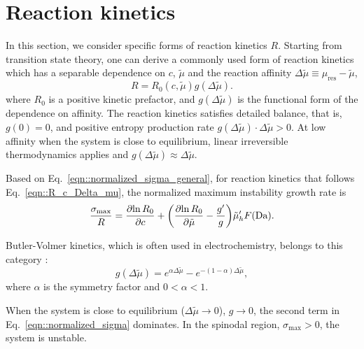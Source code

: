 \documentclass[reprint,aps,pre,superscriptaddress]{revtex4-2}
\newcommand{\pderiv}[2]{\frac{\partial {#1}}{\partial {#2}}}
\let\originalleft\left
\let\originalright\right
\renewcommand{\left}{\mathopen{}\mathclose\bgroup\originalleft}
\renewcommand{\right}{\aftergroup\egroup\originalright}
\begin{document}
\section{Reaction kinetics}
\label{sec::reaction_kinetics}
In this section, we consider specific forms of reaction kinetics $R$.
Starting from transition state theory, one can derive a commonly used form of reaction kinetics \cite{Bazant2013} which has a separable dependence on $c$, $\tilde{\mu}$ and the reaction affinity $\Delta \tilde{\mu} \equiv \mu_\text{res}-\tilde{\mu}$,
\begin{equation} \label{eqn::R_c_Delta_mu}
  R = R_0(c,\tilde{\mu}) g(\Delta \tilde{\mu}).
\end{equation}
where $R_0$ is a positive kinetic prefactor, and $g(\Delta \tilde{\mu})$ is the functional form of the dependence on affinity. The reaction kinetics satisfies detailed balance, that is, $g(0)=0$, and positive entropy production rate $g(\Delta \tilde{\mu}) \cdot \Delta \tilde{\mu}>0$.
At low affinity when the system is close to equilibrium, linear irreversible thermodynamics applies and $g(\Delta\tilde{\mu}) \approx \Delta \tilde{\mu}$\cite{Kondepudi2014}.

Based on Eq.~\ref{eqn::normalized_sigma_general}, for reaction kinetics that follows Eq.~\ref{eqn::R_c_Delta_mu}, the normalized maximum instability growth rate is
\begin{equation} \label{eqn::normalized_sigma}
  \frac{\sigma_\text{max}}{R} =  \pderiv{\ln{R_0}}{c} + \left( \pderiv{\ln{R_0}}{\tilde{\mu}} - \frac{g'}{g}\right) \tilde{\mu}_h' F(\text{Da}).
\end{equation}

Butler-Volmer kinetics, which is often used in electrochemistry, belongs to this category \cite{Newman2012}:
\begin{equation} \label{eqn::BV}
  g(\Delta \tilde{\mu}) = e^{\alpha \Delta \tilde{\mu}} - e^{-(1-\alpha) \Delta \tilde{\mu}},
\end{equation}
where $\alpha$ is the symmetry factor and $0<\alpha<1$.

When the system is close to equilibrium ($\Delta \tilde{\mu} \to 0$), $g\to0$, the second term in Eq.~\ref{eqn::normalized_sigma} dominates. In the spinodal region, $\sigma_\text{max}>0$, the system is unstable.
\end{document}
